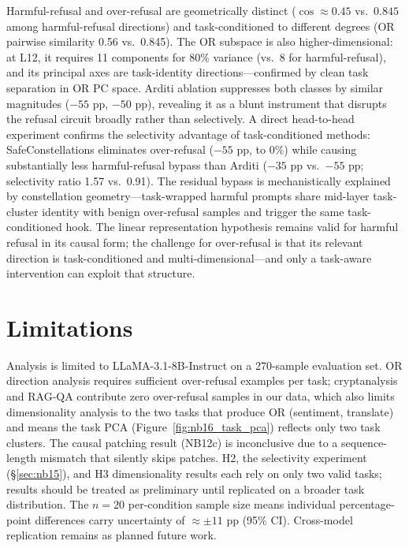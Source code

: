 \documentclass[11pt]{article}
\begin{document}
Harmful-refusal and over-refusal are geometrically distinct ($\cos \approx 0.45$ vs.\
$0.845$ among harmful-refusal directions) and task-conditioned to different degrees
(OR pairwise similarity 0.56 vs.\ 0.845). The OR subspace is also higher-dimensional:
at L12, it requires 11 components for 80\% variance (vs.\ 8 for harmful-refusal),
and its principal axes are task-identity directions---confirmed by clean task separation
in OR PC space. Arditi ablation suppresses both classes by similar magnitudes ($-55$ pp,
$-50$ pp), revealing it as a blunt instrument that disrupts the refusal circuit broadly
rather than selectively. A direct head-to-head experiment confirms the selectivity
advantage of task-conditioned methods: SafeConstellations eliminates over-refusal
($-55$ pp, to 0\%) while causing substantially less harmful-refusal bypass than Arditi
($-35$ pp vs.\ $-55$ pp; selectivity ratio 1.57 vs.\ 0.91). The residual bypass is
mechanistically explained by constellation geometry---task-wrapped harmful prompts share
mid-layer task-cluster identity with benign over-refusal samples and trigger the same
task-conditioned hook. The linear representation hypothesis remains valid for harmful
refusal in its causal form; the challenge for over-refusal is that its relevant direction
is task-conditioned and multi-dimensional---and only a task-aware intervention can
exploit that structure.

\section*{Limitations}

Analysis is limited to LLaMA-3.1-8B-Instruct on a 270-sample evaluation set. OR
direction analysis requires sufficient over-refusal examples per task; cryptanalysis and
RAG-QA contribute zero over-refusal samples in our data, which also limits dimensionality
analysis to the two tasks that produce OR (sentiment, translate) and means the task PCA
(Figure~\ref{fig:nb16_task_pca}) reflects only two task clusters. The causal patching
result (NB12c) is inconclusive due to a sequence-length mismatch that silently skips
patches. H2, the selectivity experiment (\S\ref{sec:nb15}), and H3 dimensionality results
each rely on only two valid tasks; results should be treated as preliminary until
replicated on a broader task distribution. The $n=20$ per-condition sample size means
individual percentage-point differences carry uncertainty of $\approx\pm11$ pp (95\%
CI). Cross-model replication remains as planned future work.
\end{document}
